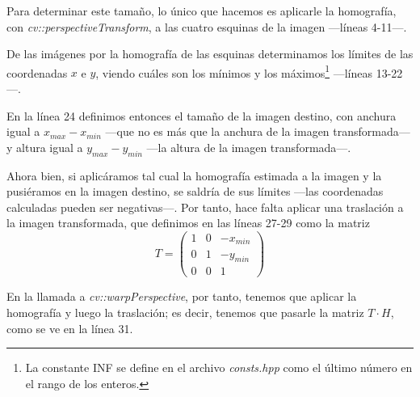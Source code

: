 \documentclass[a4paper, 11pt]{article}
\theoremstyle{definition}
\theoremstyle{theorem}
\begin{document}
  Para determinar este tamaño, lo único que hacemos es aplicarle la homografía, con \emph{cv::perspectiveTransform}, a las cuatro esquinas de la imagen ---líneas 4-11---.

  De las imágenes por la homografía de las esquinas determinamos los límites de las coordenadas $x$ e $y$, viendo cuáles son los mínimos y los máximos\footnote{La constante INF se define en el archivo \emph{consts.hpp} como el último número en el rango de los enteros.} ---líneas 13-22---.

  En la línea 24 definimos entonces el tamaño de la imagen destino, con anchura igual a $x_{max} - x_{min}$ ---que no es más que la anchura de la imagen transformada--- y altura igual a $y_{max} - y_{min}$ ---la altura de la imagen transformada---.

  Ahora bien, si aplicáramos tal cual la homografía estimada a la imagen y la pusiéramos en la imagen destino, se saldría de sus límites ---las coordenadas calculadas pueden ser negativas---. Por tanto, hace falta aplicar una traslación a la imagen transformada, que definimos en las líneas 27-29 como la matriz
  \[
  T = \begin{pmatrix}
      1 & 0 & -x_{min} \\
      0 & 1 & -y_{min} \\
      0 & 0 & 1
  \end{pmatrix}
  \]

  En la llamada a \emph{cv::warpPerspective}, por tanto, tenemos que aplicar la homografía y luego la traslación; es decir, tenemos que pasarle la matriz $T \cdot H$, como se ve en la línea 31.
\end{document}
